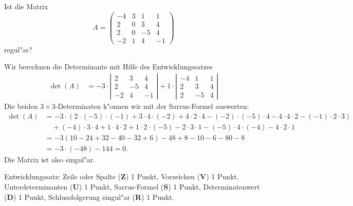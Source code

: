 Ist die Matrix
\[
A=
\begin{pmatrix}
  -4 & 3 & 1 & 1\\
   2 & 0 & 3 & 4\\
   2 & 0 &-5 & 4\\
  -2 & 1 & 4 &-1
\end{pmatrix}
\]
regul"ar?

\begin{loesung}
Wir berechnen die Determinante mit Hilfe des Entwicklungssatzes
\begin{align*}
\det(A)
&=
-
3\cdot\left|
\begin{matrix}
 2& 3& 4\\
 2&-5& 4\\
-2& 4&-1
\end{matrix}
\right|
+
1\cdot\left|
\begin{matrix}
-4& 1& 1\\
 2& 3& 4\\
 2&-5& 4
\end{matrix}
\right|
\end{align*}
Die beiden $3\times 3$-Determinaten k"onnen wir mit der Sarrus-Formel
auswerten:
\begin{align*}
\det(A)
&=
-3\cdot(
2\cdot(-5)\cdot(-1) + 3\cdot 4\cdot(-2)+4\cdot 2\cdot 4
-(-2)\cdot(-5)\cdot 4-4\cdot 4\cdot 2 - (-1)\cdot 2\cdot 3
)
\\
&\quad+
(-4)\cdot 3\cdot 4+1\cdot 4\cdot 2+1\cdot 2\cdot(-5)
-2\cdot 3\cdot 1-(-5)\cdot 4\cdot(-4) -4\cdot 2\cdot 1
\\
&=-3(10-24+32-40-32+6)-48+8-10-6-80-8
\\
&=-3\cdot (-48)-144=0.
\end{align*}
Die Matrix ist also singul"ar.
\end{loesung}

\begin{bewertung}
Entwicklungssatz: Zeile oder Spalte ({\bf Z}) 1 Punkt,
Vorzeichen ({\bf V}) 1 Punkt,
Unterdeterminanten ({\bf U}) 1 Punkt,
Sarrus-Formel ({\bf S}) 1 Punkt,
Determinatenwert ({\bf D}) 1 Punkt,
Schlussfolgerung singul"ar ({\bf R}) 1 Punkt.
\end{bewertung}

